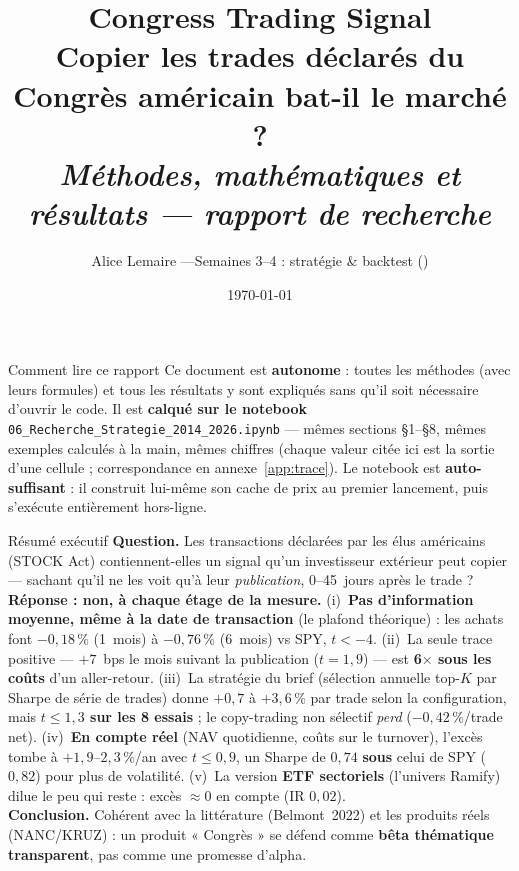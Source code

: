 \documentclass[11pt,a4paper]{article}
\title{\textbf{Congress Trading Signal}\\[4pt]
\large Copier les trades déclarés du Congrès américain bat-il le marché ?\\
\large \emph{Méthodes, mathématiques et résultats --- rapport de recherche}}
\author{Alice Lemaire \quad---\quad Semaines 3--4 : stratégie \& backtest
\quad(\code{06\_Recherche\_Strategie\_2014\_2026.ipynb})}
\date{\today}
\newcommand{\code}[1]{\texttt{\small #1}}
\begin{document}
\maketitle

\begin{defbox}{Comment lire ce rapport}
Ce document est \textbf{autonome} : toutes les méthodes (avec leurs formules) et tous les résultats y sont
expliqués sans qu'il soit nécessaire d'ouvrir le code. Il est \textbf{calqué sur le notebook}
\code{06\_Recherche\_Strategie\_2014\_2026.ipynb} --- mêmes sections \S1--\S8, mêmes exemples calculés à la
main, mêmes chiffres (chaque valeur citée ici est la sortie d'une cellule ; correspondance en
annexe~\ref{app:trace}). Le notebook est \textbf{auto-suffisant} : il construit lui-même son cache de prix
au premier lancement, puis s'exécute entièrement hors-ligne.
\end{defbox}

\begin{keybox}{Résumé exécutif}
\textbf{Question.} Les transactions déclarées par les élus américains (STOCK Act) contiennent-elles un
signal qu'un investisseur extérieur peut copier --- sachant qu'il ne les voit qu'à leur \emph{publication},
0--45~jours après le trade ?\\[2pt]
\textbf{Réponse : non, à chaque étage de la mesure.}
(i)~\textbf{Pas d'information moyenne, même à la date de transaction} (le plafond théorique) : les achats
font $-0{,}18\,\%$ (1~mois) à $-0{,}76\,\%$ (6~mois) vs SPY, $t<-4$.
(ii)~La seule trace positive --- $+7$~bps le mois suivant la publication ($t=1{,}9$) --- est
\textbf{6$\times$ sous les coûts} d'un aller-retour.
(iii)~La stratégie du brief (sélection annuelle top-$K$ par Sharpe de série de trades) donne $+0{,}7$ à
$+3{,}6\,\%$ par trade selon la configuration, mais \textbf{$t\leq1{,}3$ sur les 8 essais} ; le copy-trading
non sélectif \emph{perd} ($-0{,}42\,\%$/trade net).
(iv)~\textbf{En compte réel} (NAV quotidienne, coûts sur le turnover), l'excès tombe à $+1{,}9$--$2{,}3\,\%$/an
avec $t\leq0{,}9$, un Sharpe de $0{,}74$ \textbf{sous} celui de SPY ($0{,}82$) pour plus de volatilité.
(v)~La version \textbf{ETF sectoriels} (l'univers Ramify) dilue le peu qui reste : excès $\approx0$ en compte
(IR $0{,}02$).\\[2pt]
\textbf{Conclusion.} Cohérent avec la littérature (Belmont~2022) et les produits réels (NANC/KRUZ) : un
produit « Congrès » se défend comme \textbf{bêta thématique transparent}, pas comme une promesse d'alpha.
\end{keybox}
\end{document}
